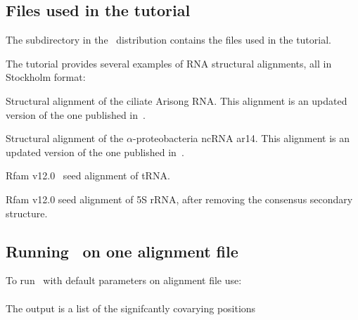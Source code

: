 \subsection{Files used in the tutorial}

The subdirectory  in the \rscape\ distribution contains the
files used in the tutorial. 

The tutorial provides several examples of RNA structural
alignments, all in Stockholm format:

\begin{sreitems}{}
\item[\emprog{updated\_Arisong.sto}] Structural alignment of the ciliate
  Arisong RNA. This alignment is an updated
  version of the one published in~\citep{JungEddy11}.
\item[\emprog{ar14.sto}] Structural alignment of the $\alpha$-proteobacteria ncRNA ar14. This alignment is an updated version of the one
  published in~\citep{delVal12}.
\item[\emprog{RF00005.sto}] Rfam v12.0~\citep{Nawrocki15} seed alignment of tRNA. 
\item[\emprog{RF00001-noss.sto}] Rfam v12.0 seed alignment of 5S rRNA, after removing the consensus secondary structure. 
\end{sreitems}


\subsection{Running \rscape\, on one alignment file}
To run \rscape\ with default parameters on alignment file
 use:\\

\\

\noindent
The output is a list of the signifcantly covarying positions

